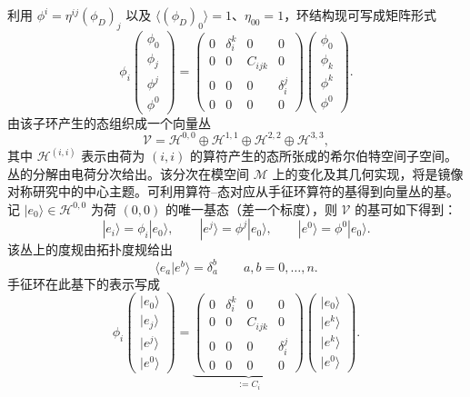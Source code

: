 利用 $\phi^{i}=\eta^{ij}(\phi_{D})_{j}$ 以及 $\langle(\phi_{D})_{0}\rangle=1$、$\eta_{00}=1$，环结构现可写成矩阵形式
\begin{equation}\tag{2.24}
\phi_{i}
\begin{pmatrix}
\phi_{0}\\
\phi_{j}\\
\phi^{j}\\
\phi^{0}
\end{pmatrix}
=
\begin{pmatrix}
0 & \delta^{k}_{i} & 0 & 0\\
0 & 0 & C_{ijk} & 0\\
0 & 0 & 0 & \delta^{j}_{i}\\
0 & 0 & 0 & 0
\end{pmatrix}
\begin{pmatrix}
\phi_{0}\\
\phi_{k}\\
\phi^{k}\\
\phi^{0}
\end{pmatrix}.
\end{equation}
由该子环产生的态组织成一个向量丛
\begin{equation}\tag{2.25}
\mathcal{V}=\mathcal{H}^{0,0}\oplus\mathcal{H}^{1,1}\oplus\mathcal{H}^{2,2}\oplus\mathcal{H}^{3,3},
\end{equation}
其中 $\mathcal{H}^{(i,i)}$ 表示由荷为 $(i,i)$ 的算符产生的态所张成的希尔伯特空间子空间。丛的分解由电荷分次给出。该分次在模空间 $\mathcal{M}$ 上的变化及其几何实现，将是镜像对称研究中的中心主题。可利用算符--态对应从手征环算符的基得到向量丛的基。记 $|e_{0}\rangle\in\mathcal{H}^{0,0}$ 为荷 $(0,0)$ 的唯一基态（差一个标度），则 $\mathcal{V}$ 的基可如下得到：
\begin{equation}\tag{2.26}
|e_{i}\rangle=\phi_{i}|e_{0}\rangle,\qquad |e^{j}\rangle=\phi^{j}|e_{0}\rangle,\qquad |e^{0}\rangle=\phi^{0}|e_{0}\rangle.
\end{equation}
该丛上的度规由拓扑度规给出
\begin{equation}\tag{2.27}
\langle e_{a}|e^{b}\rangle=\delta^{b}_{a}\qquad a,b=0,\ldots,n.
\end{equation}
手征环在此基下的表示写成
\begin{equation}\tag{2.28}
\phi_{i}
\begin{pmatrix}
|e_{0}\rangle\\
|e_{j}\rangle\\
|e^{j}\rangle\\
|e^{0}\rangle
\end{pmatrix}
=
\underbrace{
\begin{pmatrix}
0 & \delta^{k}_{i} & 0 & 0\\
0 & 0 & C_{ijk} & 0\\
0 & 0 & 0 & \delta^{j}_{i}\\
0 & 0 & 0 & 0
\end{pmatrix}}_{:=C_{i}}
\begin{pmatrix}
|e_{0}\rangle\\
|e^{k}\rangle\\
|e^{k}\rangle\\
|e^{0}\rangle
\end{pmatrix}.
\end{equation}
